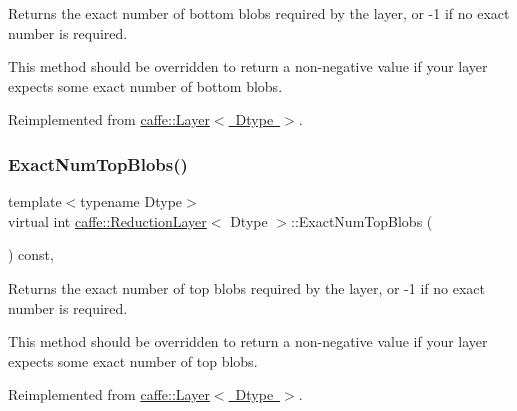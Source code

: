 Returns the exact number of bottom blobs required by the layer, or -\/1 if no exact number is required. 

This method should be overridden to return a non-\/negative value if your layer expects some exact number of bottom blobs. 

Reimplemented from \mbox{\hyperlink{classcaffe_1_1_layer_a8e5ee0494d85f5f55fc4396537cbc60f}{caffe\+::\+Layer$<$ Dtype $>$}}.

\mbox{\label{classcaffe_1_1_reduction_layer_a14224774af732030c5f1c8a3d79e1fc3}} 
\subsubsection{\texorpdfstring{Exact\+Num\+Top\+Blobs()}{ExactNumTopBlobs()}\hspace{0.1cm}{\footnotesize\ttfamily [1/2]}}
{\footnotesize\ttfamily template$<$typename Dtype$>$ \\
virtual int \mbox{\hyperlink{classcaffe_1_1_reduction_layer}{caffe\+::\+Reduction\+Layer}}$<$ Dtype $>$\+::Exact\+Num\+Top\+Blobs (\begin{DoxyParamCaption}{ }\end{DoxyParamCaption}) const\hspace{0.3cm}{\ttfamily [inline]}, {\ttfamily [virtual]}}



Returns the exact number of top blobs required by the layer, or -\/1 if no exact number is required. 

This method should be overridden to return a non-\/negative value if your layer expects some exact number of top blobs. 

Reimplemented from \mbox{\hyperlink{classcaffe_1_1_layer_a64e2ca72c719e4b2f1f9216ccfb0d37f}{caffe\+::\+Layer$<$ Dtype $>$}}.

\mbox{\label{classcaffe_1_1_reduction_layer_a14224774af732030c5f1c8a3d79e1fc3}} 

